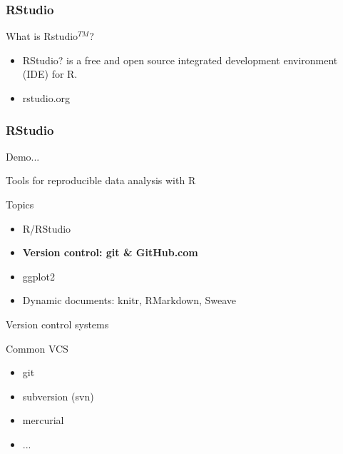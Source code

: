 \documentclass[table]{beamer}\usepackage[]{graphicx}\usepackage[]{color}
\begin{document}


\begin{frame}
\frametitle{RStudio}
What is Rstudio$^{TM}$?
\begin{itemize}
\item RStudio? is a free and open source integrated development environment (IDE) for R.
\item rstudio.org
\end{itemize}
\end{frame}


\begin{frame}
\frametitle{RStudio}

Demo...

\end{frame}






\begin{frame}{Tools for reproducible data analysis with R}

\begin{block}{Topics}
\begin{itemize}
        \item R/RStudio
       \item \textbf{Version control: git \& GitHub.com}
         \item ggplot2
        \item Dynamic documents: knitr, RMarkdown, Sweave
 \end{itemize}
\end{block}

\end{frame}


\begin{frame}{Version control systems}

\begin{block}{Common VCS}
\begin{itemize}
\item git
\item subversion (svn)
\item mercurial
\item ...
\end{itemize}
\end{block}

\end{frame}
\end{document}
